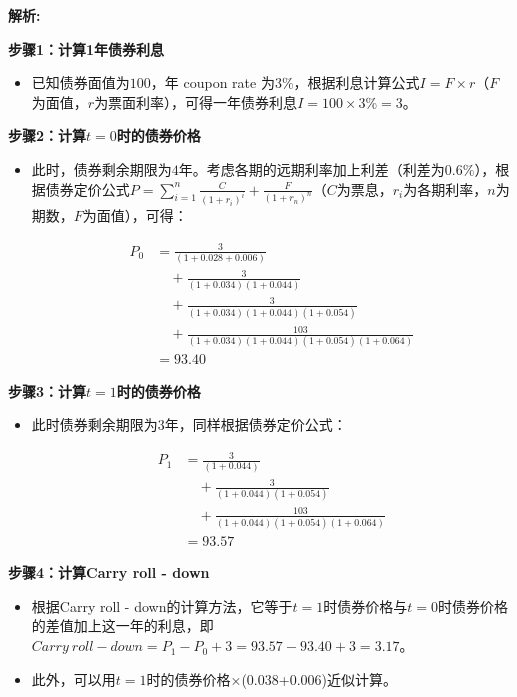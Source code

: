 \documentclass{article}
\newenvironment{explanation}
{\textbf{解析:}\par}
{\par}
\begin{document}
    \begin{explanation}
    \textbf{步骤1：计算1年债券利息}
    \begin{itemize}
    \item 已知债券面值为\(100\)，年 coupon rate 为\(3\%\)，根据利息计算公式\(I = F\times r\)（\(F\)为面值，\(r\)为票面利率），可得一年债券利息\(I = 100\times3\% = 3\)。
    \end{itemize}
    \textbf{步骤2：计算\(t = 0\)时的债券价格}
    \begin{itemize}
    \item 此时，债券剩余期限为\(4\)年。考虑各期的远期利率加上利差（利差为\(0.6\%\)），根据债券定价公式\(P=\sum_{i = 1}^{n}\frac{C}{(1 + r_i)^i}+\frac{F}{(1 + r_n)^n}\)（\(C\)为票息，\(r_i\)为各期利率，\(n\)为期数，\(F\)为面值），可得：
    
    \begin{align*}
        P_0 &= \frac{3}{(1 + 0.028 + 0.006)} \\
            &\quad + \frac{3}{(1 + 0.034)(1 + 0.044)} \\
            &\quad + \frac{3}{(1 + 0.034)(1 + 0.044)(1 + 0.054)} \\
            &\quad + \frac{103}{(1 + 0.034)(1 + 0.044)(1 + 0.054)(1 + 0.064)} \\
            &= 93.40
        \end{align*}
   
    \end{itemize}
    \textbf{步骤3：计算\(t = 1\)时的债券价格}
    \begin{itemize}
    \item 此时债券剩余期限为\(3\)年，同样根据债券定价公式：

    \begin{align*}
        P_1 &= \frac{3}{(1 + 0.044)} \\
            &\quad + \frac{3}{(1 + 0.044)(1 + 0.054)} \\
            &\quad + \frac{103}{(1 + 0.044)(1 + 0.054)(1 + 0.064)} \\
            &= 93.57
        \end{align*}

    \end{itemize}
    \textbf{步骤4：计算Carry roll - down}
    \begin{itemize}
    \item 根据Carry roll - down的计算方法，它等于\(t = 1\)时债券价格与\(t = 0\)时债券价格的差值加上这一年的利息，即\(Carry\ roll - down=P_1 - P_0 + 3=93.57 - 93.40 + 3 = 3.17\)。
    \item 此外，可以用\(t = 1\)时的债券价格×(0.038+0.006)近似计算。
    \end{itemize}
    \end{explanation}
    
\end{document}
